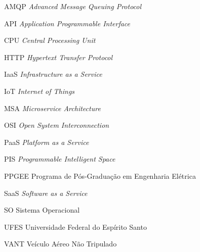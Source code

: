 \documentclass[
	12pt,				%
	openright,			%
	oneside,			%
	a4paper,			%
	chapter=TITLE,		%
	english,			%
	french,				%
	spanish,			%
	brazil				%
	]{abntex2}
\begin{document}
\begin{siglas}
\item[AMQP] \textit{Advanced Message Queuing Protocol}
\item[API] \textit{Application Programmable Interface}
\item[CPU] \textit{Central Processing Unit}
\item[HTTP] \textit{Hypertext Transfer Protocol}
\item[IaaS] \textit{Infrastructure as a Service}
\item[IoT] \textit{Internet of Things}
\item[MSA] \textit{Microservice Architecture}
\item[OSI] \textit{Open System Interconnection}
\item[PaaS] \textit{Platform as a Service}
\item[PIS] \textit{Programmable Intelligent Space}
\item[PPGEE] Programa de Pós-Graduação em Engenharia Elétrica

\item[SaaS] \textit{Software as a Service}
\item[SO] Sistema Operacional
\item[UFES] Universidade Federal do Espírito Santo
\item[VANT] Veículo Aéreo Não Tripulado
\end{siglas}
\end{document}
